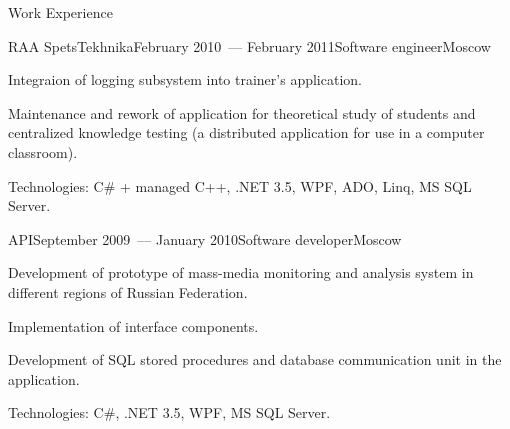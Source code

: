 \documentclass{resume} %
\begin{document}
\begin{rSection}{Work Experience}
\begin{rSubsection}{RAA SpetsTekhnika}{February 2010~--- February 2011}{Software engineer}{Moscow}
\item Integraion of logging subsystem into trainer's application.

\item Maintenance and rework of application for theoretical study of students and centralized knowledge testing
(a distributed application for use in a computer classroom).

\item Technologies: C\# + managed C++, .NET 3.5, WPF, ADO, Linq, MS SQL Server.
\end{rSubsection}


\begin{rSubsection}{API}{September 2009~--- January 2010}{Software developer}{Moscow}
\item Development of prototype of mass-media monitoring and analysis system in different regions 
of Russian Federation.

\item Implementation of interface components.

\item Development of SQL stored procedures and database communication unit in the application.

\item Technologies: C\#, .NET 3.5, WPF, MS SQL Server.
\end{rSubsection}

\end{rSection}

\end{document}
